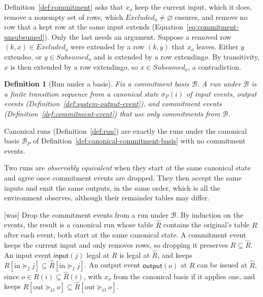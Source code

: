 \documentclass[sigconf]{cidr-2027}
\newtheorem{definition}{Definition}
\theoremstyle{remark}
\newcommand{\InputGe}{\succeq_I}
\newcommand{\OutputGe}{\succeq_O}
\newcommand{\commitment}{commitment\xspace}
\newcommand{\commitments}{commitments\xspace}
\newcommand{\outrel}{extends\xspace}          %
\newcommand{\outrelpart}{extending\xspace}    %
\newcommand{\outrelpast}{extended\xspace}     %
\newcommand{\Subsumed}{\mathit{Subsumed}}
\newcommand{\Excluded}{\mathit{Excluded}}
\begin{document}
\color{blue!70!black}Definition~\ref{def:commitment} asks that $x_o$ keep the current input, which
it does, remove a nonempty set of rows, which $\Excluded_o\neq\varnothing$
ensures, and remove no row that a kept row at the same input \outrel
(Equation~\ref{eq:commitment-unsubsumed}).  Only the last needs an argument.
Suppose a removed row $(k,x)\in\Excluded_o$ were \outrelpast by a row $(k,y)$
that $x_o$ leaves.  Either $y$ \outrel $o$, or $y\in\Subsumed_o$ and is
\outrelpast by a row \outrelpart $o$.  By transitivity, $x$ is then
\outrelpast by a row \outrelpart $o$, so $x\in\Subsumed_o$, a contradiction.\color{black}

\begin{definition}[Run under a basis]
\label{def:run-under-basis}
Fix a \commitment basis $\mathcal B$.  A \emph{run under $\mathcal B$} is a
finite transition sequence from a canonical state $\sigma_P(i)$ of input
events, output events (Definition~\ref{def:system-output-event}), and
\commitment events (Definition~\ref{def:commitment-event}) that use only
\commitments from $\mathcal B$.
\end{definition}

Canonical runs (Definition~\ref{def:run}) are exactly the runs under the
canonical basis $\mathcal B_P$ of Definition~\ref{def:canonical-commitment-basis}
with no \commitment events.

Two runs are \emph{observably equivalent} when they start at the same canonical
state and agree once \commitment events are dropped.  They then accept the same
inputs and emit the same outputs, in the same order, which is all the
environment observes, although their remainder tables may differ.



{\footnotesize\color{black!50}\noindent\textsf{[was]} Drop the \commitment events from a run under $\mathcal B$.  By induction on
the events, the result is a canonical run whose table $\widehat R$ contains
the original's table $R$ after each event; both start at the same canonical
state.  A \commitment event keeps the current input and only removes rows, so
dropping it preserves $R\subseteq\widehat R$.  An input event
$\mathsf{input}(j)$ legal at $R$ is legal at $\widehat R$, and keeps
$R[\mathrm{in}\InputGe j]\subseteq\widehat R[\mathrm{in}\InputGe j]$.  An
output event $\mathsf{output}(o)$ at $R$ can be issued at $\widehat R$, since
$o\in R(i)\subseteq\widehat R(i)$, with $x_o$ from the canonical basis if it
applies one, and keeps
$R[\mathrm{out}\OutputGe o]\subseteq\widehat R[\mathrm{out}\OutputGe o]$.\par}
\end{document}
